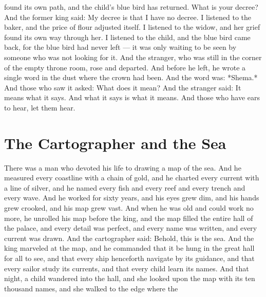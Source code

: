 \documentclass[12pt,openany]{book}
\begin{document}
found its own path, and the child's blue bird has returned. What is your decree? And the former king said: My decree is that I have no decree. I listened to the baker, and the price of flour adjusted itself. I listened to the widow, and her grief found its own way through her. I listened to the child, and the blue bird came back, for the blue bird had never left --- it was only waiting to be seen by someone who was not looking for it. And the stranger, who was still in the corner of the empty throne room, rose and departed. And before he left, he wrote a single word in the dust where the crown had been. And the word was: *Shema.* And those who saw it asked: What does it mean? And the stranger said: It means what it says. And what it says is what it means. And those who have ears to hear, let them hear.


\chapter{The Cartographer and the Sea}

There was a man who devoted his life to drawing a map of the sea. And he measured every coastline with a chain of gold, and he charted every current with a line of silver, and he named every fish and every reef and every trench and every wave. And he worked for sixty years, and his eyes grew dim, and his hands grew crooked, and his map grew vast. And when he was old and could work no more, he unrolled his map before the king, and the map filled the entire hall of the palace, and every detail was perfect, and every name was written, and every current was drawn. And the cartographer said: Behold, this is the sea. And the king marveled at the map, and he commanded that it be hung in the great hall for all to see, and that every ship henceforth navigate by its guidance, and that every sailor study its currents, and that every child learn its names. And that night, a child wandered into the hall, and she looked upon the map with its ten thousand names, and she walked to the edge where the
\end{document}
